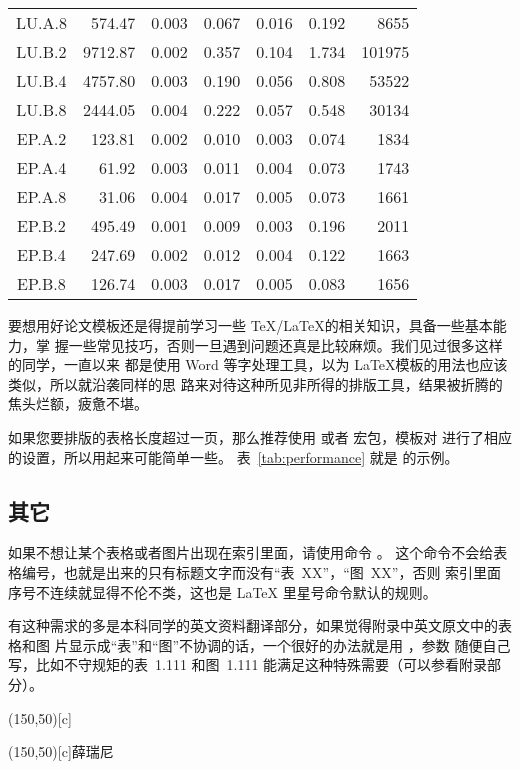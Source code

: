 \begin{longtable}[c]{c*{6}{r}}
LU.A.8 & 574.47 & 0.003 & 0.067 & 0.016 & 0.192 & 8655 \\
LU.B.2 & 9712.87 & 0.002 & 0.357 & 0.104 & 1.734 & 101975 \\
LU.B.4 & 4757.80 & 0.003 & 0.190 & 0.056 & 0.808 & 53522 \\
LU.B.8 & 2444.05 & 0.004 & 0.222 & 0.057 & 0.548 & 30134 \\
EP.A.2 & 123.81 & 0.002 & 0.010 & 0.003 & 0.074 & 1834 \\
EP.A.4 & 61.92 & 0.003 & 0.011 & 0.004 & 0.073 & 1743 \\
EP.A.8 & 31.06 & 0.004 & 0.017 & 0.005 & 0.073 & 1661 \\
EP.B.2 & 495.49 & 0.001 & 0.009 & 0.003 & 0.196 & 2011 \\
EP.B.4 & 247.69 & 0.002 & 0.012 & 0.004 & 0.122 & 1663 \\
EP.B.8 & 126.74 & 0.003 & 0.017 & 0.005 & 0.083 & 1656 \\
\bottomrule[1.5pt]
\end{longtable}

要想用好论文模板还是得提前学习一些 \TeX/\LaTeX{}的相关知识，具备一些基本能力，掌
握一些常见技巧，否则一旦遇到问题还真是比较麻烦。我们见过很多这样的同学，一直以来
都是使用 Word 等字处理工具，以为 \LaTeX{}模板的用法也应该类似，所以就沿袭同样的思
路来对待这种所见非所得的排版工具，结果被折腾的焦头烂额，疲惫不堪。

如果您要排版的表格长度超过一页，那么推荐使用  或者 
宏包，模板对  进行了相应的设置，所以用起来可能简单一些。
表~\ref{tab:performance} 就是  的示例。

\subsection{其它}
\label{sec:tableother}
如果不想让某个表格或者图片出现在索引里面，请使用命令 。
这个命令不会给表格编号，也就是出来的只有标题文字而没有“表~XX”，“图~XX”，否则
索引里面序号不连续就显得不伦不类，这也是 \LaTeX{} 里星号命令默认的规则。

有这种需求的多是本科同学的英文资料翻译部分，如果觉得附录中英文原文中的表格和图
片显示成“表”和“图”不协调的话，一个很好的办法就是用 ，参数
随便自己写，比如不守规矩的表~1.111 和图~1.111 能满足这种特殊需要（可以参看附录部
分）。
\begin{table}[ht]
  \begin{minipage}{0.4\linewidth}
    \centering
    \caption*{表~1.111\quad 这是一个手动编号，不出现在索引中的表格。}
    \label{tab:badtabular}
      \framebox(150,50)[c]{\thuthesis}
  \end{minipage}%
  \hfill%
  \begin{minipage}{0.4\linewidth}
    \centering
    \caption*{Figure~1.111\quad 这是一个手动编号，不出现在索引中的图。}
    \label{tab:badfigure}
    \framebox(150,50)[c]{薛瑞尼}
  \end{minipage}
\end{table}

